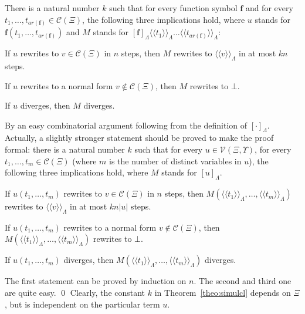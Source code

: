 \documentclass{LMCS}
\newcommand{\funone}{\mathbf{f}}
\newcommand{\lambdaone}{M}
\newcommand{\termone}{t}
\newcommand{\termtwo}{u}
\newcommand{\termthree}{v}
\newcommand{\TRSonetolambdaI}[1]{\langle\!\langle #1\rangle\!\rangle_{\Lambdaterms}}
\newcommand{\TRSonetolambdaII}[1]{[#1]_{\Lambdaterms}}
\newcommand{\errorterm}{\bot}
\newcommand{\arity}[1]{\mathit{ar}(#1)}
\newcommand{\Variables}{\Upsilon}
\newcommand{\Lambdaterms}{\Lambda}
\newcommand{\TRSone}{\Xi}
\newcommand{\TRSvartermsp}[1]{\mathcal{V}(#1,\Variables)}
\newcommand{\TRScontermsp}[1]{\mathcal{C}(#1)}
\newcommand{\length}[1]{|#1|}
\newenvironment{varitemize}
{
\begin{list}{\labelitemi}
{\setlength{\itemsep}{0.0mm}
 \setlength{\topsep}{0.0mm}
 \setlength{\parindent}{0.0mm}
 \setlength{\parskip}{0.0mm}
 \setlength{\parsep}{0.0mm}
 \setlength{\partopsep}{0.0mm}
 \setlength{\leftmargin}{15pt}
 \setlength{\labelsep}{5pt}
 \setlength{\labelwidth}{10pt}}}
{
 \end{list} 
}
\newcounter{number}
\begin{document}
\begin{thm}\label{theo:simulcl}
There is a natural number $k$ such that for every
function symbol $\funone$ and for every 
$\termone_1,\ldots,\termone_{\arity{\funone}}\in\TRScontermsp{\TRSone}$,
the following three implications hold, where
$\termtwo$ stands for $\funone(\termone_1,\ldots,\termone_{\arity{\funone}})$
and $\lambdaone$ stands for 
$\TRSonetolambdaII{\funone}\TRSonetolambdaI{\termone_1}\ldots\TRSonetolambdaI{\termone_{\arity{\funone}}}$:
\begin{varitemize}
\item
If $\termtwo$ rewrites to
$\termthree\in\TRScontermsp{\TRSone}$ in $n$ steps, then
$\lambdaone$ rewrites to $\TRSonetolambdaI{\termthree}$ in
at most $kn$ steps.
\item
If $\termtwo$ rewrites to a normal form
$\termthree\notin\TRScontermsp{\TRSone}$, then
$\lambdaone$ rewrites to $\errorterm$.
\item
If $\termtwo$ diverges, then $\lambdaone$ diverges.
\end{varitemize}
\end{thm}
\proof
By an easy combinatorial argument following from the definition
of $\TRSonetolambdaII{\cdot}$. Actually, a slightly stronger statement
should be proved to make the proof formal:
there is a natural number $k$ such that for every $\termtwo\in\TRSvartermsp{\TRSone}$,
for every $\termone_1,\ldots,\termone_m\in\TRScontermsp{\TRSone}$ (where $m$ is 
the number of distinct variables in $\termtwo$),
the following three implications hold, where 
$\lambdaone$ stands for 
$\TRSonetolambdaII{\termtwo}$. 
\begin{varitemize}
\item
If $\termtwo(\termone_1,\ldots,\termone_m)$ rewrites to
$\termthree\in\TRScontermsp{\TRSone}$ in $n$ steps, then
$\lambdaone(\TRSonetolambdaI{\termone_1},\ldots,\TRSonetolambdaI{\termone_m})$ rewrites to 
$\TRSonetolambdaI{\termthree}$ in
at most $kn\length{\termtwo}$ steps.
\item
If $\termtwo(\termone_1,\ldots,\termone_m)$ rewrites to a normal form
$\termthree\notin\TRScontermsp{\TRSone}$, then
$\lambdaone(\TRSonetolambdaI{\termone_1},\ldots,\TRSonetolambdaI{\termone_m})$ 
rewrites to $\errorterm$.
\item
If $\termtwo(\termone_1,\ldots,\termone_m)$ diverges, then 
$\lambdaone(\TRSonetolambdaI{\termone_1},\ldots,\TRSonetolambdaI{\termone_m})$ diverges.
\end{varitemize}
The first statement can be proved by induction on $n$. The second and third one
are quite easy.
\qed
Clearly, the constant $k$ in
Theorem~\ref{theo:simulcl} depends on $\TRSone$, but is independent on the particular
term $\termtwo$.
\end{document}
